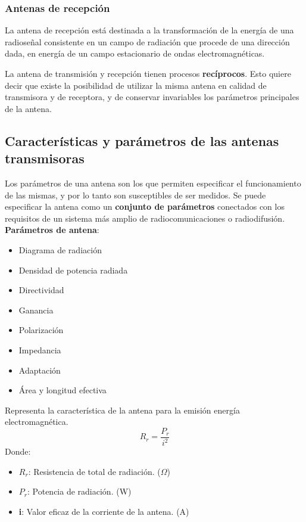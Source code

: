 \documentclass[
	12pt, %
	fleqn, %
	a4paper, %
	oneside, %
]{LegrandOrangeBook}
\begin{document}
\subsubsection*{Antenas de recepción}
La antena de recepción está destinada a la transformación de la energía de una radioseñal consistente en un campo de radiación que procede de una dirección dada, en energía de un campo estacionario de ondas electromagnéticas.
\begin{remark}
La antena de transmisión y recepción tienen procesos \textbf{recíprocos}. Esto quiere decir que existe la posibilidad de utilizar la misma antena en calidad de transmisora y de receptora, y de conservar invariables los parámetros principales de la antena.
\end{remark}
\subsection{Características y parámetros de las antenas transmisoras}
Los parámetros de una antena son los que permiten especificar el funcionamiento de las mismas, y por lo tanto son susceptibles de ser medidos. Se puede especificar la antena como un \textbf{conjunto de parámetros} conectados con los  requisitos de un sistema más amplio de radiocomunicaciones o radiodifusión.\\
\textbf{Parámetros de antena}:
\begin{itemize}
\item Diagrama de radiación
\item Densidad de potencia radiada
\item Directividad
\item Ganancia
\item Polarización
\item Impedancia
\item Adaptación
\item Área y longitud efectiva
\end{itemize}
\begin{definition}
Representa la característica de la antena para la emisión energía electromagnética.
\begin{equation}
R_r=\frac{P_r}{i^2}
\label{eq:resistencia radiacion}
\end{equation}
Donde:
\begin{itemize}
\item $R_r$: Resistencia de total de radiación. ($\Omega$)
\item $P_r$: Potencia de radiación. (W)
\item \textbf{i}: Valor eficaz de la corriente de la antena. (A)
\end{itemize}
\end{definition}
\end{document}
